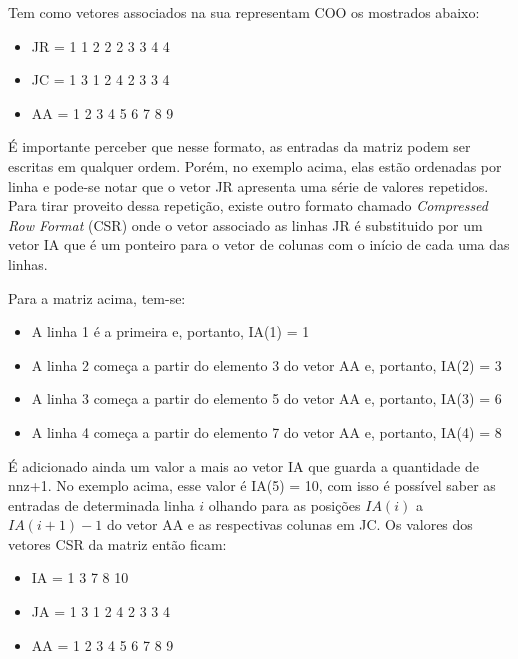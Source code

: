 Tem como vetores associados na sua representam COO os mostrados abaixo:


\begin{center}
    \begin{itemize}
        \item  JR = 1 1 2 2 2 3 3 4 4
        \item  JC = 1 3 1 2 4 2 3 3 4
        \item  AA = 1 2 3 4 5 6 7 8 9
    \end{itemize}
\end{center}


É importante perceber que nesse formato, as entradas da matriz podem ser escritas em qualquer ordem. Porém, no exemplo acima, elas estão ordenadas por linha e pode-se notar que o vetor JR apresenta uma série de valores repetidos. Para tirar proveito dessa repetição, existe outro formato chamado \textit{Compressed Row Format} (CSR) onde o vetor associado as linhas JR é substituido por um vetor IA que é um ponteiro para o vetor de colunas com o início de cada uma das linhas.

Para a matriz acima, tem-se:

\begin{itemize}
    \item A linha 1 é a primeira e, portanto, IA(1) = 1
    \item A linha 2 começa a partir do elemento 3 do vetor AA e, portanto, IA(2) = 3
    \item A linha 3 começa a partir do elemento 5 do vetor AA e, portanto, IA(3) = 6
    \item A linha 4 começa a partir do elemento 7 do vetor AA e, portanto, IA(4) = 8
\end{itemize}

É adicionado ainda um valor a mais ao vetor IA que guarda a quantidade de nnz+1. No exemplo acima, esse valor é  IA(5) = 10, com isso é possível saber as entradas de determinada linha $i$ olhando para as posições $IA(i)$ a $IA(i+1)-1$ do vetor AA e as respectivas colunas em JC. Os valores dos vetores CSR da matriz então ficam:

\begin{center}
    \begin{itemize}
        \item IA = 1 3 7 8 10
        \item JA = 1 3 1 2 4 2 3 3 4
        \item AA = 1 2 3 4 5 6 7 8 9
    \end{itemize}
\end{center}


